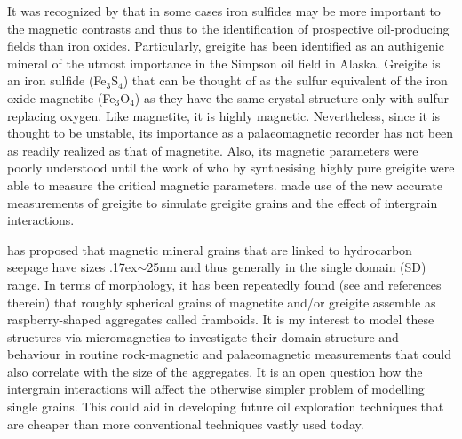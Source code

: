 It was recognized by \citet{Reynolds} that in some cases iron sulfides may be more important to the magnetic contrasts and thus to the identification of prospective oil-producing fields than iron oxides. Particularly, greigite has been identified as an authigenic mineral of the utmost importance in the Simpson oil field in Alaska. Greigite is an iron sulfide (Fe$_3$S$_4$) that can be thought of as the sulfur equivalent of the iron oxide magnetite (Fe$_3$O$_4$) as they have the same crystal structure only with sulfur replacing oxygen. Like magnetite, it is highly magnetic. Nevertheless, since it is thought to be unstable, its importance as a palaeomagnetic recorder has not been as readily realized as that of magnetite. Also, its magnetic parameters were poorly understood until the work of \citet{Chang} who by synthesising highly pure greigite were able to measure the critical magnetic parameters. \citet{Mxwt1} made use of the new accurate measurements of greigite to simulate greigite grains and the effect of intergrain interactions.\par

\citet{Liu} has proposed that magnetic mineral grains that are linked to hydrocarbon seepage have sizes {\raise.17ex\hbox{$\scriptstyle\sim$}}25nm and thus generally in the single domain (SD) range. In terms of morphology, it has been repeatedly found (see \citet{Aldana} and references therein) that roughly spherical grains of magnetite and/or greigite assemble as raspberry-shaped aggregates called framboids. It is my interest to model these structures via micromagnetics to investigate their domain structure and behaviour in routine rock-magnetic and palaeomagnetic measurements that could also correlate with the size of the aggregates. It is an open question how the intergrain interactions will affect the otherwise simpler problem of modelling single grains. This could aid in developing future oil exploration techniques that are cheaper than more conventional techniques vastly used today.\par